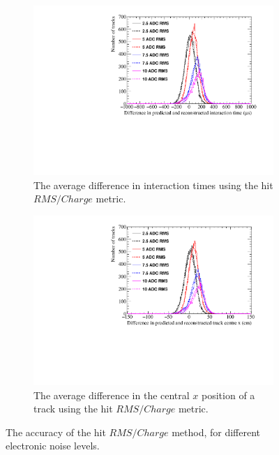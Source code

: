 \begin{figure}[h!]
  \centering
  \begin{subfigure}{0.6\textwidth}
    \centering
    \includegraphics[width=\textwidth]{Canvas_AvDiff_T_RMS_Q_NoiseLevel}
    \caption{The average difference in interaction times using the hit $RMS/Charge$ metric.}
    \label{fig:DiffNoiseStudy_AvDiff_RMS_Int_T}
  \end{subfigure}
  \begin{subfigure}{0.6\textwidth}
    \centering
    \includegraphics[width=\textwidth]{Canvas_AvDiff_X_RMS_Q_NoiseLevel}
    \caption{The average difference in the central $x$ position of a track using the hit $RMS/Charge$ metric.}
    \label{fig:DiffNoiseStudy_AvDiff_RMS_Int_X}
  \end{subfigure}
  \caption[Comparing the accuracy of the hit $RMS$ method, as the electronic noise level changes]
          {The accuracy of the hit $RMS/Charge$ method, for different electronic noise levels.}
  \label{fig:DiffNoiseStudy_AvDiff_RMS_Int}
\end{figure}

